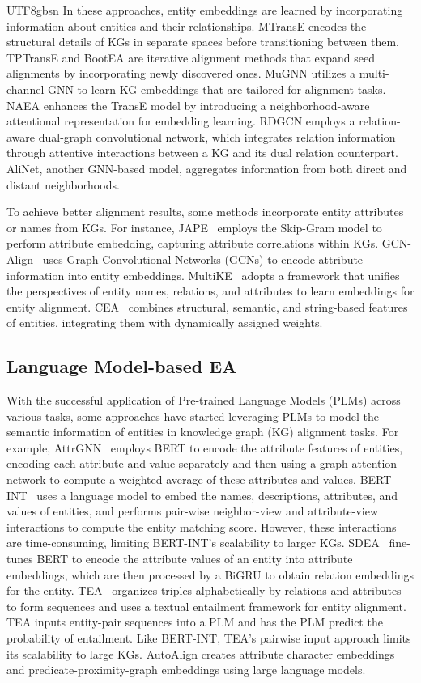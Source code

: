 \documentclass[preprint,12pt]{elsarticle}
\begin{document}
\begin{CJK}{UTF8}{gbsn}
In these approaches, entity embeddings are learned by incorporating information about entities and their relationships. MTransE encodes the structural details of KGs in separate spaces before transitioning between them. TPTransE and BootEA are iterative alignment methods that expand seed alignments by incorporating newly discovered ones. MuGNN utilizes a multi-channel GNN to learn KG embeddings that are tailored for alignment tasks. NAEA enhances the TransE model by introducing a neighborhood-aware attentional representation for embedding learning. RDGCN employs a relation-aware dual-graph convolutional network, which integrates relation information through attentive interactions between a KG and its dual relation counterpart. AliNet, another GNN-based model, aggregates information from both direct and distant neighborhoods.

To achieve better alignment results, some methods incorporate entity attributes or names from KGs. For instance, JAPE~\cite{jape} employs the Skip-Gram model to perform attribute embedding, capturing attribute correlations within KGs. GCN-Align~\cite{gcnalign} uses Graph Convolutional Networks (GCNs) to encode attribute information into entity embeddings. MultiKE~\cite{multike} adopts a framework that unifies the perspectives of entity names, relations, and attributes to learn embeddings for entity alignment. CEA~\cite{cea} combines structural, semantic, and string-based features of entities, integrating them with dynamically assigned weights.


\subsection{Language Model-based EA}
With the successful application of Pre-trained Language Models (PLMs) across various tasks, some approaches have started leveraging PLMs to model the semantic information of entities in knowledge graph (KG) alignment tasks. For example, AttrGNN~\cite{AttrGNN} employs BERT to encode the attribute features of entities, encoding each attribute and value separately and then using a graph attention network to compute a weighted average of these attributes and values. BERT-INT~\cite{bertint} uses a language model to embed the names, descriptions, attributes, and values of entities, and performs pair-wise neighbor-view and attribute-view interactions to compute the entity matching score. However, these interactions are time-consuming, limiting BERT-INT's scalability to larger KGs. SDEA~\cite{SDEA} fine-tunes BERT to encode the attribute values of an entity into attribute embeddings, which are then processed by a BiGRU to obtain relation embeddings for the entity. TEA~\cite{tea} organizes triples alphabetically by relations and attributes to form sequences and uses a textual entailment framework for entity alignment. TEA inputs entity-pair sequences into a PLM and has the PLM predict the probability of entailment. Like BERT-INT, TEA's pairwise input approach limits its scalability to large KGs. AutoAlign creates attribute character embeddings and predicate-proximity-graph embeddings using large language models.


\end{CJK}
\end{document}
